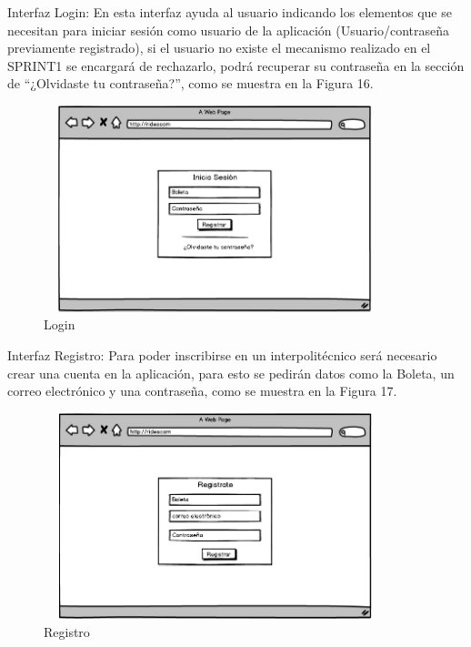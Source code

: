 	Interfaz Login: En esta interfaz ayuda al usuario indicando los elementos que se necesitan para iniciar sesión como usuario de la aplicación (Usuario/contraseña previamente registrado), si el usuario no existe el mecanismo realizado en el SPRINT1 se encargará de rechazarlo, podrá recuperar su contraseña en la sección de “¿Olvidaste tu contraseña?”, como se muestra en la Figura 16. \pagebreak
	\begin{figure}[hbt!]
		\centering
		\includegraphics[width=10cm, height=6cm]{Imagenes/Disenos/Login.png}
		\caption{Login}
	\end{figure}
	
	Interfaz Registro: Para poder inscribirse en un interpolitécnico será necesario crear una cuenta en la aplicación, para esto se pedirán datos como la Boleta, un correo electrónico y una contraseña, como se muestra en la Figura 17.
	\begin{figure}[hbt!]
		\centering
		\includegraphics[width=10cm, height=6cm]{Imagenes/Disenos/Registro.png}
		\caption{Registro}
	\end{figure}
	\pagebreak
	

